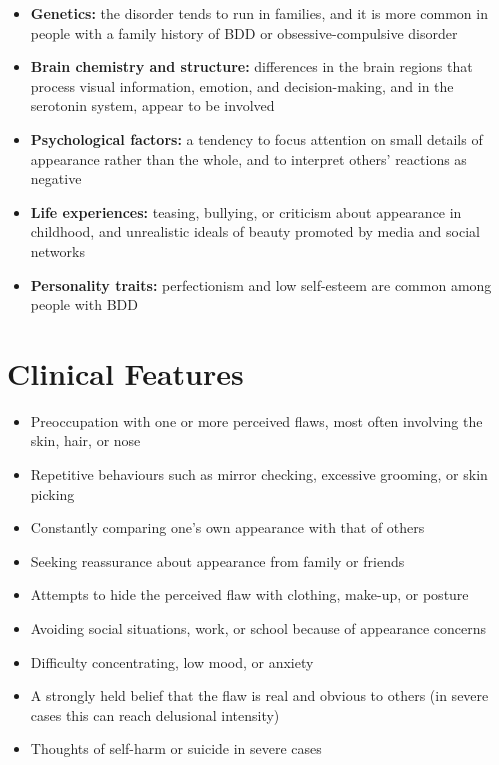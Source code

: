 \begin{itemize}
    \item \textbf{Genetics:} the disorder tends to run in families, and it is more common in people with a family history of BDD or obsessive-compulsive disorder
    \item \textbf{Brain chemistry and structure:} differences in the brain regions that process visual information, emotion, and decision-making, and in the serotonin system, appear to be involved
    \item \textbf{Psychological factors:} a tendency to focus attention on small details of appearance rather than the whole, and to interpret others' reactions as negative
    \item \textbf{Life experiences:} teasing, bullying, or criticism about appearance in childhood, and unrealistic ideals of beauty promoted by media and social networks
    \item \textbf{Personality traits:} perfectionism and low self-esteem are common among people with BDD
\end{itemize}

\section*{Clinical Features}
\begin{itemize}
    \item Preoccupation with one or more perceived flaws, most often involving the skin, hair, or nose
    \item Repetitive behaviours such as mirror checking, excessive grooming, or skin picking
    \item Constantly comparing one's own appearance with that of others
    \item Seeking reassurance about appearance from family or friends
    \item Attempts to hide the perceived flaw with clothing, make-up, or posture
    \item Avoiding social situations, work, or school because of appearance concerns
    \item Difficulty concentrating, low mood, or anxiety
    \item A strongly held belief that the flaw is real and obvious to others (in severe cases this can reach delusional intensity)
    \item Thoughts of self-harm or suicide in severe cases
\end{itemize}

